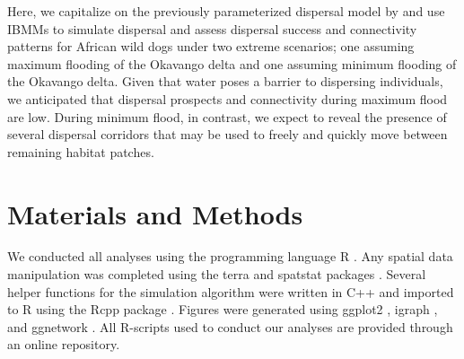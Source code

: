 \documentclass[abstract=on,10pt,a4paper,bibliography=totocnumbered]{article}
\begin{document}
Here, we capitalize on the previously parameterized dispersal model by
\cite{Hofmann.2023} and use IBMMs to simulate dispersal and assess dispersal
success and connectivity patterns for African wild dogs under two extreme
scenarios; one assuming maximum flooding of the Okavango delta and one assuming
minimum flooding of the Okavango delta. Given that water poses a barrier to
dispersing individuals, we anticipated that dispersal prospects and connectivity
during maximum flood are low. During minimum flood, in contrast, we expect to
reveal the presence of several dispersal corridors that may be used to freely
and quickly move between remaining habitat patches.

\section{Materials and Methods}
We conducted all analyses using the programming language \textsf{R}
\citep{RCoreTeam.2022}. Any spatial data manipulation was completed using the
\textsf{terra} \citep{Hijmans.2022} and \textsf{spatstat} packages
\citep{Baddeley.2015}. Several helper functions for the simulation algorithm
were written in \textsf{C++} and imported to R using the \textsf{Rcpp} package
\citep{Eddelbuettel.2011}. Figures were generated using \textsf{ggplot2}
\citep{Wickham.2016}, \textsf{igraph} \citep{Csardi.2006}, and
\textsf{ggnetwork} \citep{Briatte.2021}. All R-scripts used to conduct our
analyses are provided through an online repository.
\end{document}
